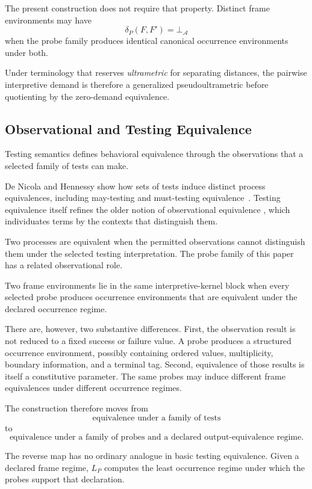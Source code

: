\documentclass[11pt]{article}
\theoremstyle{plain}
\theoremstyle{definition}
\theoremstyle{remark}
\begin{document}
The present construction does not require
that property.
Distinct frame environments may have
\[
  \delta_P(F,F')
  =
  \bot_{\mathcal{A}}
\]
when the probe family produces
identical canonical occurrence environments
under both.

Under terminology that reserves
\emph{ultrametric}
for separating distances,
the pairwise interpretive demand
is therefore a generalized pseudoultrametric
before quotienting by
the zero-demand equivalence.

\subsection{Observational and Testing Equivalence}

Testing semantics defines behavioral equivalence
through the observations that a selected family of tests can make.

De Nicola and Hennessy show how sets of tests
induce distinct process equivalences,
including may-testing and must-testing equivalence~\citep{denicola1984testing}.
Testing equivalence itself refines the older notion of
observational equivalence \citep{morris1968lambda, plotkin1977lcf},
which individuates terms by the contexts that distinguish them.

Two processes are equivalent when the permitted observations
cannot distinguish them under the selected testing interpretation.
The probe family of this paper has a related observational role.

Two frame environments lie in the same interpretive-kernel block
when every selected probe produces occurrence environments
that are equivalent under the declared occurrence regime.

There are, however, two substantive differences.
First, the observation result is not reduced
to a fixed success or failure value.
A probe produces a structured occurrence environment,
possibly containing ordered values,
multiplicity,
boundary information,
and a terminal tag.
Second, equivalence of those results is itself a constitutive parameter.
The same probes may induce different frame equivalences
under different occurrence regimes.

The construction therefore moves from
\[
  \text{equivalence under a family of tests}
\]
to
\[
  \text{equivalence under a family of probes
    and a declared output-equivalence regime}.
\]

The reverse map
has no ordinary analogue
in basic testing equivalence.
Given a declared frame regime,
\(L_P\) computes
the least occurrence regime
under which the probes support that declaration.
\end{document}
